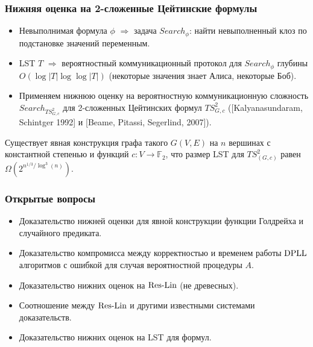 \begin{frame}
    \frametitle{Нижняя оценка на 2-сложенные Цейтинские формулы}

    \begin{itemize}
		\item Невыполнимая формула $\phi$ $\Rightarrow$ задача $Search_\phi$: найти невыполненный клоз по подстановке
		    значений переменным.
        \pause 
		\item LST $T$ $\Rightarrow$ вероятностный коммуникационный протокол для $Search_\phi$ глубины $O(\log |T|
		    \log\log |T|)$ (некоторые значения знает Алиса, некоторые Боб).
        \pause
		\item Применяем нижнюю оценку на вероятностную коммуникационную сложность $Search_{TS^2_{G,c}}$ для 2-сложенных
		    Цейтинских формул $TS^2_{G,c}$ ([Kalyanasundaram, Schintger 1992] и [Beame, Pitassi, Segerlind, 2007]).
	\end{itemize}
	\pause
    \begin{theorem}
        Существует явная конструкция графа такого $G(V, E)$ на $n$ вершинах с константной степенью и функций $c: V \to
        \mathbb{F}_2$, что размер LST для $TS^2_{(G,c)}$ равен $\Omega\left(2^{n^{1 / 3} / \log^3(n)} \right)$.
    \end{theorem}
\end{frame}


\begin{frame}
    \frametitle{Открытые вопросы}

    \begin{itemize}
        \item Доказательство нижней оценки для явной конструкции функции Голдрейха и случайного предиката.
        \item Доказательство компромисса между корректностью и временем работы $\mathrm{DPLL}$ алгоритмов с ошибкой для случая
    		вероятностной процедуры $A$.
		\item Доказательство нижних оценок на $\mathrm{Res\mbox{-}Lin}$ (не древесных).
		\item Соотношение между $\mathrm{Res\mbox{-}Lin}$ и другими известными системами доказательств.
		\item Доказательство нижних оценок на LST для  формул.
	\end{itemize}
\end{frame}


